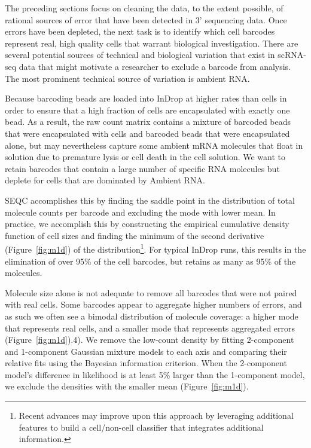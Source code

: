 The preceding sections focus on cleaning the data, to the extent possible, of rational sources of error that have been detected in 3' sequencing data. 
Once errors have been depleted, the next task is to identify which cell barcodes represent real, high quality cells that warrant biological investigation. 
There are several potential sources of technical and biological variation that exist in scRNA-seq data that might motivate a researcher to exclude a barcode from analysis. 
The most prominent technical source of variation is ambient RNA. 

Because barcoding beads are loaded into InDrop at higher rates than cells in order to ensure that a high fraction of cells are encapsulated with exactly one bead. 
As a result, the raw count matrix contains a mixture of barcoded beads that were encapsulated with cells and barcoded beads that were encapsulated alone, but may nevertheless capture some ambient mRNA molecules that float in solution due to premature lysis or cell death in the cell solution. 
We want to retain barcodes that contain a large number of specific RNA molecules but deplete for cells that are dominated by Ambient RNA\@. 

SEQC accomplishes this by finding the saddle point in the distribution of total molecule counts per barcode and excluding the mode with lower mean. 
In practice, we accomplish this by constructing the empirical cumulative density function of cell sizes and finding the minimum of the second derivative (Figure~\ref{fig:m1d}) of the distribution\footnote{Recent advances may improve upon this approach by leveraging additional features to build a cell/non-cell classifier that integrates additional information\citep{Petukhov2017}.}.
For typical InDrop runs, this results in the elimination of over 95\% of the cell barcodes, but retains as many as 95\% of the molecules.

Molecule size alone is not adequate to remove all barcodes that were not paired with real cells. 
Some barcodes appear to aggregate higher numbers of errors, and as such we often see a bimodal distribution of molecule coverage: a higher mode that represents real cells, and a smaller mode that represents aggregated errors (Figure~\ref{fig:m1d}).4). 
We remove the low-count density by fitting 2-component and 1-component Gaussian mixture models to each axis and comparing their relative fits using the Bayesian information criterion. 
When the 2-component model's difference in likelihood is at least 5\% larger than the 1-component model, we exclude the densities with the smaller mean (Figure~\ref{fig:m1d}).


